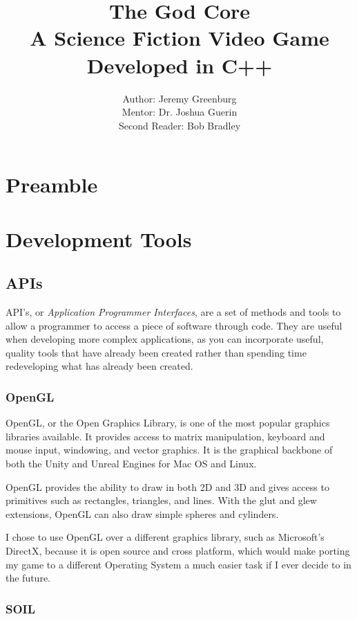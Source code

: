 \documentclass{article}
\author{Author: Jeremy Greenburg \\ Mentor: Dr. Joshua Guerin \\ Second Reader: Bob Bradley}
\title{The God Core \\ A Science Fiction Video Game Developed in C++}
\begin{document}
\maketitle
\pagebreak

\tableofcontents

\pagebreak

\section{Preamble}

\section{Development Tools}

\subsection{APIs}

API's, or \emph{Application Programmer Interfaces}, are a set of methods and tools to allow a programmer to access a piece of software through code. They are useful when developing more complex applications, as you can incorporate useful, quality tools that have already been created rather than spending time redeveloping what has already been created.

\subsubsection{OpenGL}

OpenGL, or the Open Graphics Library, is one of the most popular graphics libraries available. It provides access to matrix manipulation, keyboard and mouse input, windowing, and vector graphics. It is the graphical backbone of both the Unity and Unreal Engines for Mac OS and Linux.

OpenGL provides the ability to draw in both 2D and 3D and gives access to primitives such as rectangles, triangles, and lines. With the glut and glew extensions, OpenGL can also draw simple spheres and cylinders.

I chose to use OpenGL over a different graphics library, such as Microsoft's DirectX, because it is open source and cross platform, which would make porting my game to a different Operating System a much easier task if I ever decide to in the future.

\subsubsection{SOIL}
\end{document}

